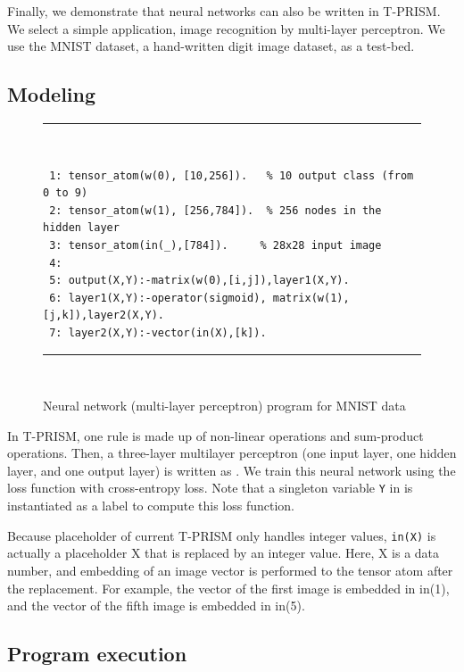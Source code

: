\documentclass[a4paper]{report}
\begin{document}
Finally, we demonstrate that neural networks can also be written in T-PRISM.
We select a simple application, image recognition by multi-layer perceptron.
We use the MNIST dataset, a hand-written digit image dataset, as a test-bed.

\subsection*{Modeling}

\begin{figure}[tb]
	\rule{0.85\textwidth}{0.10mm}\\ [-1em]
	\begin{verbatim}
 1: tensor_atom(w(0), [10,256]).   % 10 output class (from 0 to 9)
 2: tensor_atom(w(1), [256,784]).  % 256 nodes in the hidden layer
 3: tensor_atom(in(_),[784]).     % 28x28 input image
 4: 
 5: output(X,Y):-matrix(w(0),[i,j]),layer1(X,Y).
 6: layer1(X,Y):-operator(sigmoid), matrix(w(1),[j,k]),layer2(X,Y).
 7: layer2(X,Y):-vector(in(X),[k]).
	\end{verbatim}
	\rule{0.85\textwidth}{0.10mm}\\ [-1em]
	\caption{Neural network (multi-layer perceptron) program for MNIST data}
	\label{fig:nn}
\end{figure}

In  T-PRISM,  one  rule  is  made  up  of  non-linear  operations  and
sum-product  operations.  Then,  a  three-layer multilayer  perceptron
(one input layer,  one hidden layer, and one output  layer) is written
as .   We train this  neural network using  the loss
function with cross-entropy loss.
Note  that  a singleton  variable  {\tt  Y} in    is
instantiated as a label to compute this loss function.  


Because placeholder of current T-PRISM only handles integer values, {\tt in(X)} is actually a placeholder X that is replaced by an integer value.
Here, X is a data number, and embedding of an image vector is performed to the tensor atom after the replacement.
For example, the vector of the first image is embedded in in(1), and the vector of the fifth image is embedded in in(5).

\subsection*{Program execution}
\end{document}
